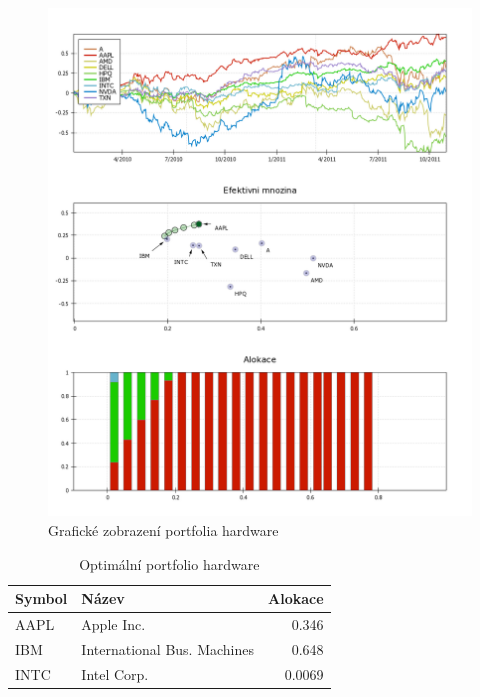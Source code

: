 \documentclass[a4paper,12pt]{report}
\begin{document}
    \begin{figure}[htb]
      \centering
        \includegraphics[height=0.95\textheight]{hw1.png}
       \caption{Grafické zobrazení portfolia hardware}
    \end{figure}

    \begin{table}[htb]
      \centering
      \begin{tabular}{|l|l|r|}
        \hline
        Symbol&Název&Alokace\\\hline\hline
        AAPL&Apple Inc. &0.346\\\hline
        IBM&International Bus. Machines &0.648\\\hline
        INTC&Intel Corp. &0.0069\\\hline
      \end{tabular}
      \caption{Optimální portfolio hardware}
    \end{table}
    
  \clearpage
\end{document}

